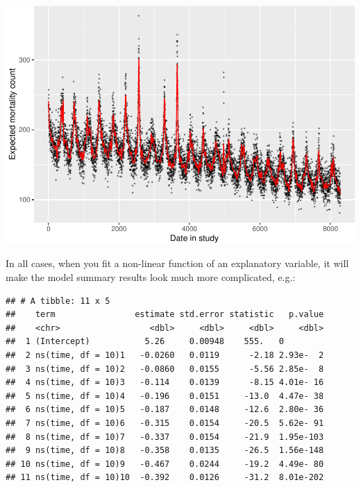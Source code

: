 \documentclass[
]{book}
\newenvironment{Shaded}{\begin{snugshade}}{\end{snugshade}}
\newcommand{\KeywordTok}[1]{\textcolor[rgb]{0.13,0.29,0.53}{\textbf{#1}}}
\newcommand{\NormalTok}[1]{#1}
\newcommand{\OperatorTok}[1]{\textcolor[rgb]{0.81,0.36,0.00}{\textbf{#1}}}
\newcommand{\StringTok}[1]{\textcolor[rgb]{0.31,0.60,0.02}{#1}}
\begin{document}
\includegraphics{adv_epi_analysis_files/figure-latex/unnamed-chunk-54-1.pdf}

In all cases, when you fit a non-linear function of an explanatory variable,
it will make the model summary results look much more complicated, e.g.:

\begin{Shaded}
\end{Shaded}

\begin{verbatim}
## # A tibble: 11 x 5
##    term                estimate std.error statistic   p.value
##    <chr>                  <dbl>     <dbl>     <dbl>     <dbl>
##  1 (Intercept)           5.26     0.00948    555.   0        
##  2 ns(time, df = 10)1   -0.0260   0.0119      -2.18 2.93e-  2
##  3 ns(time, df = 10)2   -0.0860   0.0155      -5.56 2.85e-  8
##  4 ns(time, df = 10)3   -0.114    0.0139      -8.15 4.01e- 16
##  5 ns(time, df = 10)4   -0.196    0.0151     -13.0  4.47e- 38
##  6 ns(time, df = 10)5   -0.187    0.0148     -12.6  2.80e- 36
##  7 ns(time, df = 10)6   -0.315    0.0154     -20.5  5.62e- 91
##  8 ns(time, df = 10)7   -0.337    0.0154     -21.9  1.95e-103
##  9 ns(time, df = 10)8   -0.358    0.0135     -26.5  1.56e-148
## 10 ns(time, df = 10)9   -0.467    0.0244     -19.2  4.49e- 80
## 11 ns(time, df = 10)10  -0.392    0.0126     -31.2  8.01e-202
\end{verbatim}
\end{document}
